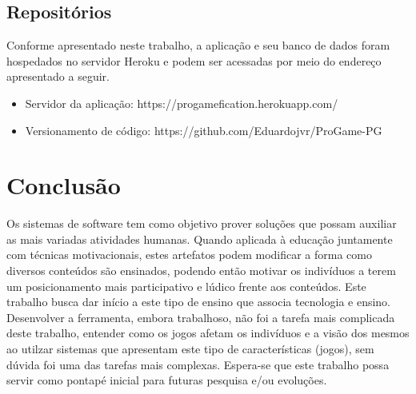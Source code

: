 \section{Repositórios}

Conforme apresentado neste trabalho, a aplicação e seu banco de dados foram hospedados no servidor Heroku e 
podem ser acessadas por meio do endereço apresentado a seguir.

\begin{itemize}
	\item Servidor da aplicação: https://progamefication.herokuapp.com/
	\item Versionamento de código: https://github.com/Eduardojvr/ProGame-PG
\end{itemize}

\pagebreak

\chapter{Conclusão}

Os sistemas de software tem como objetivo prover soluções que possam auxiliar as mais variadas
atividades humanas. Quando aplicada à educação juntamente com técnicas motivacionais, estes artefatos
podem modificar a forma como diversos conteúdos são ensinados, podendo então motivar os indivíduos a terem
um posicionamento mais participativo e lúdico frente aos conteúdos. Este trabalho busca dar início a este tipo
de ensino que associa tecnologia e ensino. Desenvolver a ferramenta, embora trabalhoso, não foi a tarefa mais 
complicada deste trabalho, entender como os jogos afetam os indivíduos e a visão dos mesmos ao utilzar sistemas
que apresentam este tipo de características (jogos), sem dúvida foi uma das tarefas mais complexas. Espera-se 
que este trabalho possa servir como pontapé inicial para futuras pesquisa e/ou evoluções.
